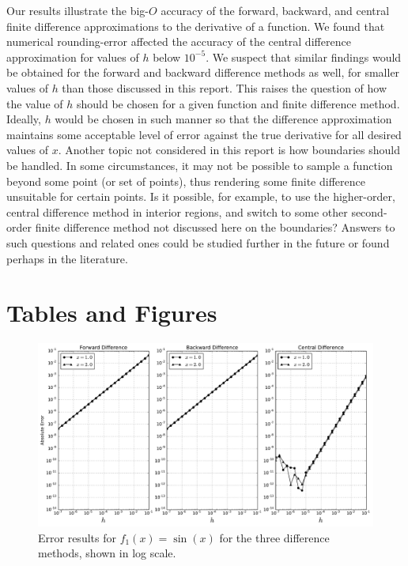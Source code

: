 \documentclass[11pt]{article}
\begin{document}
Our results illustrate the big-$O$ accuracy of the forward, backward, and central finite difference approximations to the derivative of a function. We found that numerical rounding-error affected the accuracy of the  central difference approximation for values of $h$ below $10^{-5}$. We suspect that similar findings would be obtained for the forward and backward difference methods as well, for smaller values of $h$ than those discussed in this report. This raises the question of how the value of $h$ should be chosen for a given function and finite difference method. Ideally, $h$ would be chosen in such manner so that the difference approximation maintains some acceptable level of error against the true derivative for all desired values of $x$. Another topic not considered in this report is how boundaries should be handled. In some circumstances, it may not be possible to sample a function beyond some point (or set of points), thus rendering some finite difference unsuitable for certain points. Is it possible, for example, to use the higher-order, central difference method in interior regions, and switch to some other second-order finite difference method not discussed here on the boundaries? Answers to such questions and related ones could be studied further in the future or found perhaps in the literature.

\section{Tables and Figures}

\begin{figure}[!ht]
    \centering
    \includegraphics[width=\textwidth]{../figures/f1.pdf}
    \caption{Error results for $f_1(x) = \sin(x)$ for the three difference methods, shown in log scale.}
    \label{fig:func1-results}
\end{figure}
\end{document}
